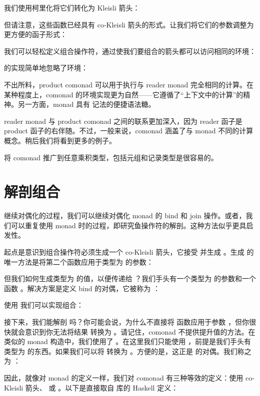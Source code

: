 我们使用柯里化将它们转化为 Kleisli 箭头：

但请注意，这些函数已经具有 co-Kleisli 箭头的形式。让我们将它们的参数调整为更方便的函子形式：

我们可以轻松定义组合操作符，通过使我们要组合的箭头都可以访问相同的环境：

 的实现简单地忽略了环境：

不出所料，product comonad 可以用于执行与 reader monad 完全相同的计算。在某种程度上，comonad 的环境实现更为自然——它遵循了“上下文中的计算”的精神。另一方面，monad 具有  记法的便捷语法糖。

reader monad 与 product comonad 之间的联系更加深入，因为 reader 函子是 product 函子的右伴随。不过，一般来说，comonad 涵盖了与 monad 不同的计算概念。稍后我们将看到更多的例子。

将  comonad 推广到任意乘积类型，包括元组和记录类型是很容易的。

\section{解剖组合}

继续对偶化的过程，我们可以继续对偶化 monad 的 bind 和 join 操作。或者，我们可以重复使用 monad 时的过程，即研究鱼操作符的解剖。这种方法似乎更具启发性。

起点是意识到组合操作符必须生成一个 co-Kleisli 箭头，它接受  并生成 。生成  的唯一方法是将第二个函数应用于类型为  的参数：

但我们如何生成类型为  的值，以便传递给 ？我们手头有一个类型为  的参数和一个函数 。解决方案是定义 bind 的对偶，它被称为 ：

使用  我们可以实现组合：

接下来，我们能解剖  吗？你可能会说，为什么不直接将  函数应用于参数 ，但你很快就会意识到你无法将结果  转换为 。请记住，comonad 不提供提升值的方法。在类似的 monad 构造中，我们使用了 。在这里我们只能使用 ，前提是我们手头有类型为  的东西。如果我们可以将  转换为 。方便的是，这正是  的对偶。我们称之为 ：

因此，就像对 monad 的定义一样，我们对 comonad 有三种等效的定义：使用 co-Kleisli 箭头、 或 。以下是直接取自  库的 Haskell 定义：

